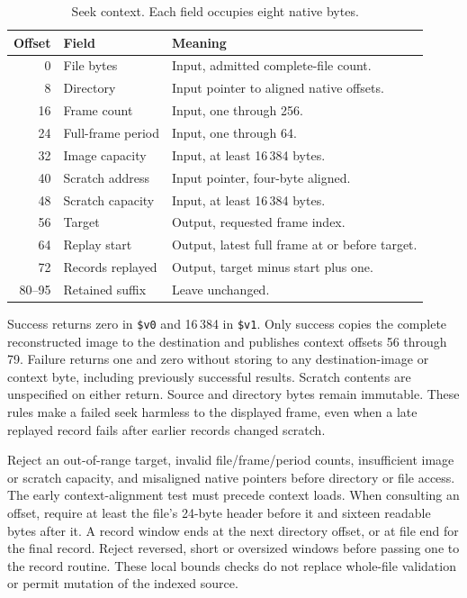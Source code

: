 \begin{table}[htbp]
  \centering
  \caption{Seek context. Each field occupies eight native bytes.}
  \label{tab:video-seek-context}
  \begin{tabular}{r p{1.4in} p{2.9in}}
    \toprule
    Offset & Field             & Meaning                                        \\
    \midrule
    0      & File bytes        & Input, admitted complete-file count.           \\
    8      & Directory         & Input pointer to aligned native offsets.       \\
    16     & Frame count       & Input, one through 256.                        \\
    24     & Full-frame period & Input, one through 64.                         \\
    32     & Image capacity    & Input, at least 16\,384 bytes.                 \\
    40     & Scratch address   & Input pointer, four-byte aligned.              \\
    48     & Scratch capacity  & Input, at least 16\,384 bytes.                 \\
    56     & Target            & Output, requested frame index.                 \\
    64     & Replay start      & Output, latest full frame at or before target. \\
    72     & Records replayed  & Output, target minus start plus one.           \\
    80--95 & Retained suffix   & Leave unchanged.                               \\
    \bottomrule
  \end{tabular}
\end{table}

Success returns zero in \texttt{\$v0} and 16\,384 in \texttt{\$v1}. Only
success copies the complete reconstructed image to the destination and publishes
context offsets 56 through 79. Failure returns one and zero without storing to
any destination-image or context byte, including previously successful results.
Scratch contents are unspecified on either return. Source and directory bytes
remain immutable. These rules make a failed seek harmless to the displayed frame,
even when a late replayed record fails after earlier records changed scratch.

Reject an out-of-range target, invalid file/frame/period counts, insufficient image
or scratch capacity, and misaligned native pointers before directory or file access.
The early context-alignment test must precede context loads. When consulting an
offset, require at least the file's 24-byte header before it and sixteen readable
bytes after it. A record window ends at the next directory offset, or at file end
for the final record. Reject reversed, short or oversized windows before passing
one to the record routine. These local bounds checks do not replace whole-file
validation or permit mutation of the indexed source.


